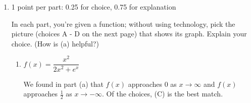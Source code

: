 \documentclass{article}
\begin{document}
\begin{enumerate}
\begin{enumerate}
\begin{enumerate}
    \item
      \begin{problem}[\vfill]
        $\displaystyle \lim_{x \to \infty} \dfrac{3 e^{2x} - x - 3}{e^{2x} + 1}$
      \end{problem}

      \begin{solution}
        As $x to \infty$ the dominant terms in the numerator
        and denominator are $3e^{2x}$ and $e^{2x}$ respectively.
        \begin{align*}
          \lim_{x \to \infty} \frac{3 e^{2x} - x - 3}{e^{2x} + 1} &=
          \lim_{x \to \infty} \frac{3 e^{2x}}{e^{2x}} \\
          &= \lim_{x \to \infty} 3 \\
          &= 3
        \end{align*}
      \end{solution}

    \item
      \begin{problem}[\vfill]
        $\displaystyle \lim_{x \to -\infty} \dfrac{3 e^{2x} - x - 3}{e^{2x} + 1}$
      \end{problem}

      \begin{solution}
        As $x\to-\infty$, the dominant terms in the numerator
        and denominator are $-x$ and $1$ respectively.
        \begin{align*}
          \lim_{x \to -\infty} \frac{3 e^{2x} - x - 3}{e^{2x} + 1}
          &= \lim_{x \to -\infty} \frac{-x}{1} \\
          &= \infty
        \end{align*}
      \end{solution}

    \end{enumerate}

  \item

    \begin{grading}
      1 point per part: 0.25 for choice, 0.75 for explanation
    \end{grading}

    In each part, you're given a function; without using technology, pick the picture (choices A - D on the next page) that shows its graph. Explain your choice. (How is (a) helpful?)

    \begin{enumerate}
    \item
      \begin{problem}[\nstretch{0.75}]
        $f(x) = \dfrac{x^2}{2x^2 + e^x}$
      \end{problem}
      \begin{solution}
        We found in part (a) that $f(x)$ approaches $0$
        as $x \to \infty$ and $f(x)$ approaches $\frac{1}{2}$
        as $x \to -\infty$. Of the choices, (C) is the best match.
      \end{solution}


\end{enumerate}
\end{enumerate}
\end{enumerate}
\end{document}
